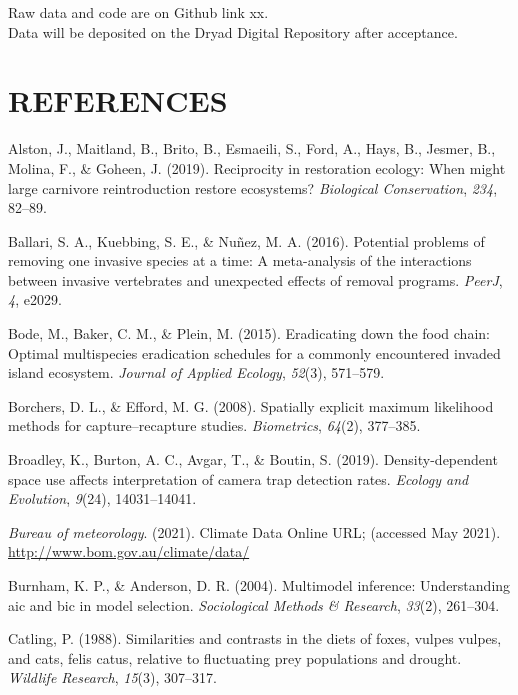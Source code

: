 \documentclass[]{elsarticle} %
\begin{document}
Raw data and code are on Github link xx.\\
Data will be deposited on the Dryad Digital Repository after acceptance.

\newpage

\hypertarget{references}{%
\section*{REFERENCES}\label{references}}

\hypertarget{refs}{}
\leavevmode\hypertarget{ref-alston2019}{}%
Alston, J., Maitland, B., Brito, B., Esmaeili, S., Ford, A., Hays, B., Jesmer, B., Molina, F., \& Goheen, J. (2019). Reciprocity in restoration ecology: When might large carnivore reintroduction restore ecosystems? \emph{Biological Conservation}, \emph{234}, 82--89.

\leavevmode\hypertarget{ref-ballari2016}{}%
Ballari, S. A., Kuebbing, S. E., \& Nuñez, M. A. (2016). Potential problems of removing one invasive species at a time: A meta-analysis of the interactions between invasive vertebrates and unexpected effects of removal programs. \emph{PeerJ}, \emph{4}, e2029.

\leavevmode\hypertarget{ref-bode2015}{}%
Bode, M., Baker, C. M., \& Plein, M. (2015). Eradicating down the food chain: Optimal multispecies eradication schedules for a commonly encountered invaded island ecosystem. \emph{Journal of Applied Ecology}, \emph{52}(3), 571--579.

\leavevmode\hypertarget{ref-borchers2008}{}%
Borchers, D. L., \& Efford, M. G. (2008). Spatially explicit maximum likelihood methods for capture--recapture studies. \emph{Biometrics}, \emph{64}(2), 377--385.

\leavevmode\hypertarget{ref-broadley2019}{}%
Broadley, K., Burton, A. C., Avgar, T., \& Boutin, S. (2019). Density-dependent space use affects interpretation of camera trap detection rates. \emph{Ecology and Evolution}, \emph{9}(24), 14031--14041.

\leavevmode\hypertarget{ref-BOM2021}{}%
\emph{Bureau of meteorology}. (2021). Climate Data Online URL; (accessed May 2021). \url{http://www.bom.gov.au/climate/data/}

\leavevmode\hypertarget{ref-burnham2004}{}%
Burnham, K. P., \& Anderson, D. R. (2004). Multimodel inference: Understanding aic and bic in model selection. \emph{Sociological Methods \& Research}, \emph{33}(2), 261--304.

\leavevmode\hypertarget{ref-catling1988}{}%
Catling, P. (1988). Similarities and contrasts in the diets of foxes, vulpes vulpes, and cats, felis catus, relative to fluctuating prey populations and drought. \emph{Wildlife Research}, \emph{15}(3), 307--317.
\end{document}
